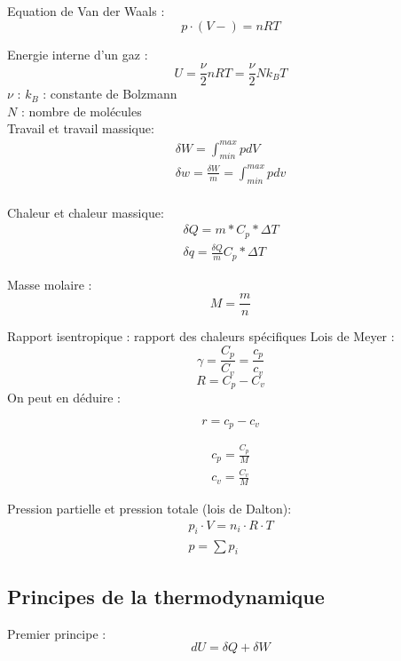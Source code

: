 \documentclass[12pt,a4paper,twoside]{article}
\numberwithin{equation}{subsection}
\begin{document}
Equation de Van der Waals :
\begin{equation}
p \cdot (V-)=n R T
\end{equation}

Energie interne d'un gaz :
\begin{equation}
U=\frac{\nu}{2} nRT=\frac{\nu}{2} N k_B T
\end{equation}
$\nu$ : 
$k_B$ : constante de Bolzmann\\
$N$ :  nombre de molécules\\

Travail et travail massique:
\begin{eqnarray}
\delta W=\int_{min}^{max} p dV\\
\delta w=\frac{\delta W}{m} =\int_{min}^{max} p dv\\
\end{eqnarray}

Chaleur et chaleur massique: 
\begin{eqnarray}
\delta Q=m*C_p*\Delta T\\
\delta q= \frac{\delta Q}{m} C_p* \Delta T
\end{eqnarray}

Masse molaire :
\begin{equation}
M=\frac{m}{n}
\end{equation}

Rapport isentropique : rapport des chaleurs spécifiques
Lois de Meyer :
\begin{equation}
\gamma=\frac{C_p}{C_v}=\frac{c_p}{c_v}
\end{equation}
\begin{equation}
R=C_p-C_v
\end{equation}
On peut en déduire :

\begin{equation}
r=c_p-c_v
\end{equation}

\begin{eqnarray}
c_p=\frac{C_p}{M}\\
c_v=\frac{C_v}{M}
\end{eqnarray}

Pression partielle et pression totale (lois de Dalton):
\begin{eqnarray}
p_i \cdot V=n_i \cdot R \cdot T\\
p=\sum p_i
\end{eqnarray}

\subsection{Principes de la thermodynamique}
Premier principe :
\begin{equation}
dU=\delta Q + \delta W
\end{equation}
\end{document}
